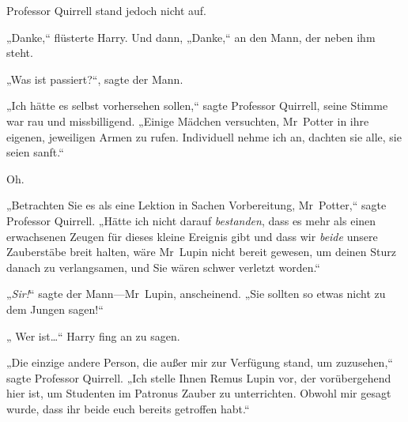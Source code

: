Professor Quirrell stand jedoch nicht auf.

„Danke,“ flüsterte Harry. Und dann, „Danke,“ an den Mann, der neben ihm steht.

„Was ist passiert?“, sagte der Mann.

„Ich hätte es selbst vorhersehen sollen,“ sagte Professor Quirrell, seine Stimme war rau und missbilligend. „Einige Mädchen versuchten, Mr~Potter in ihre eigenen, jeweiligen Armen zu rufen. Individuell nehme ich an, dachten sie alle, sie seien sanft.“

Oh.

„Betrachten Sie es als eine Lektion in Sachen Vorbereitung, Mr~Potter,“ sagte Professor Quirrell. „Hätte ich nicht darauf \emph{bestanden}, dass es mehr als einen erwachsenen Zeugen für dieses kleine Ereignis gibt und dass wir \emph{beide} unsere Zauberstäbe breit halten, wäre Mr~Lupin nicht bereit gewesen, um deinen Sturz danach zu verlangsamen, und Sie wären schwer verletzt worden.“

„\emph{Sir!}“ sagte der Mann—Mr~Lupin, anscheinend. „Sie sollten so etwas nicht zu dem Jungen sagen!“

„ Wer ist…“ Harry fing an zu sagen.

„Die einzige andere Person, die außer mir zur Verfügung stand, um zuzusehen,“ sagte Professor Quirrell. „Ich stelle Ihnen Remus Lupin vor, der vorübergehend hier ist, um Studenten im Patronus Zauber zu unterrichten. Obwohl mir gesagt wurde, dass ihr beide euch bereits getroffen habt.“

